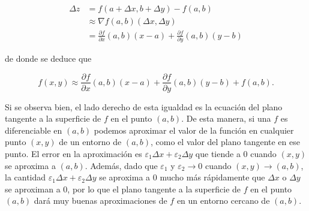 \documentclass[
  a4paper,
]{scrreport}
\theoremstyle{definition}
\theoremstyle{plain}
\theoremstyle{plain}
\theoremstyle{definition}
\theoremstyle{definition}
\theoremstyle{plain}
\theoremstyle{remark}
\begin{document}
\begin{align*}
\Delta z 
&= f(a+\Delta x, b+\Delta y) - f(a,b) \\
&\approx \nabla f(a, b) (\Delta x, \Delta y) \\
&= \frac{\partial f}{\partial x}(a,b)(x-a) + \frac{\partial f}{\partial y}(a,b)(y-b)
\end{align*}

de donde se deduce que

\[
f(x, y) \approx \frac{\partial f}{\partial x}(a,b)(x-a) + \frac{\partial f}{\partial y}(a,b)(y-b) + f(a,b).
\]

Si se observa bien, el lado derecho de esta igualdad es la ecuación del
plano tangente a la superficie de \(f\) en el punto \((a,b)\). De esta
manera, si una \(f\) es diferenciable en \((a,b)\) podemos aproximar el
valor de la función en cualquier punto \((x,y)\) de un entorno de
\((a,b)\), como el valor del plano tangente en ese punto. El error en la
aproximación es \(\varepsilon_1 \Delta x + \varepsilon_2 \Delta y\) que
tiende a \(0\) cuando \((x,y)\) se aproxima a \((a,b)\). Además, dado
que \(\varepsilon_1\) y \(\varepsilon_2 \to 0\) cuando
\((x,y)\to (a,b)\), la cantidad
\(\varepsilon_1 \Delta x + \varepsilon_2 \Delta y\) se aproxima a \(0\)
mucho más rápidamente que \(\Delta x\) o \(\Delta y\) se aproximan a
\(0\), por lo que el plano tangente a la superficie de \(f\) en el punto
\((a,b)\) dará muy buenas aproximaciones de \(f\) en un entorno cercano
de \((a,b)\).
\end{document}
